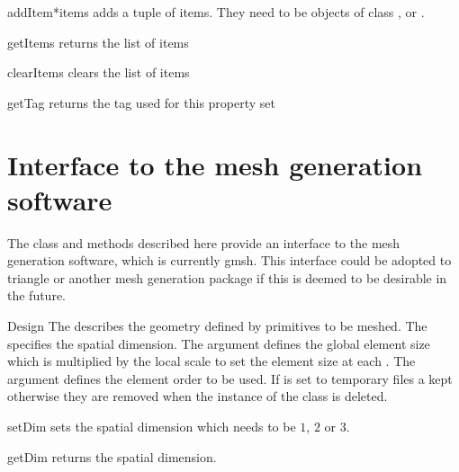 \begin{methoddesc}[PropertySet]{addItem}{*items}
adds a tuple of items. They need to be objects of class \ManifoldOneD, \ManifoldTwoD or \ManifoldThreeD. 
\end{methoddesc}

\begin{methoddesc}[PropertySet]{getItems}{}
returns the list of items
\end{methoddesc}

\begin{methoddesc}[PropertySet]{clearItems}{}
clears the list of items 
\end{methoddesc}

\begin{methoddesc}[PropertySet]{getTag}{}
returns the tag used for this property set
\end{methoddesc}

\section{Interface to the mesh generation software}

The class and methods described here provide an interface to the mesh
generation software, which is currently gmsh.  This interface could be
adopted to triangle or another mesh generation package if this is
deemed to be desirable in the future.

\begin{classdesc}{Design}{
}
The  describes the geometry defined by primitives to be meshed.
The  specifies the spatial dimension. The argument  defines the global
element size which is multiplied by the local scale to set the element size at each \Point. 
The argument  defines the element order to be used. If  is set to 
\True temporary files a kept otherwise they are removed when the instance of the class is deleted. 
\end{classdesc}


\begin{methoddesc}[Design]{setDim}{}
sets the spatial dimension which needs to be $1$, $2$ or $3$.
\end{methoddesc}

\begin{methoddesc}[Design]{getDim}{}
returns the spatial dimension.
\end{methoddesc}

